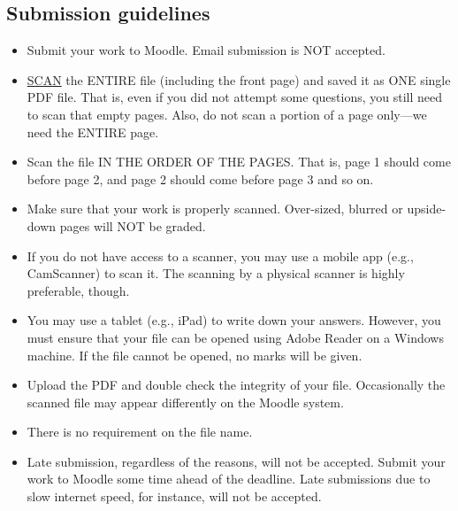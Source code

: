 \documentclass[letterpaper,11pt,addpoints]{exam}
\begin{document}
\subsection*{Submission guidelines}
\begin{itemize}
\item Submit your work to Moodle. Email submission is NOT accepted. 
\item \underline{SCAN} the ENTIRE file (including the front page) and saved it as ONE single PDF file. That is, even if you did not attempt some questions, you still need to scan that empty pages. Also, do not scan a portion of a page only---we need the ENTIRE page. 
\item Scan the file IN THE ORDER OF THE PAGES. That is, page 1 should come before page 2, and page 2 should come before page 3 and so on. 
\item Make sure that your work is properly scanned. Over-sized, blurred or upside-down pages will NOT be graded.
\item If you do not have access to a scanner, you may use a mobile app (e.g., CamScanner) to scan it. The scanning by a physical scanner is highly preferable, though.  
\item You may use a tablet (e.g., iPad) to write down your answers. However, you must ensure that your file can be opened using Adobe Reader on a Windows machine. If the file cannot be opened, no marks will be given. %

\item Upload the PDF and double check the integrity of your file. Occasionally the scanned file may appear differently on the Moodle system.
\item There is no requirement on the file name. 
\item Late submission, regardless of the reasons, will not be accepted. Submit your work to Moodle some time ahead of the deadline. Late submissions due to slow internet speed, for instance, will not be accepted.
\end{itemize}



\end{document}
